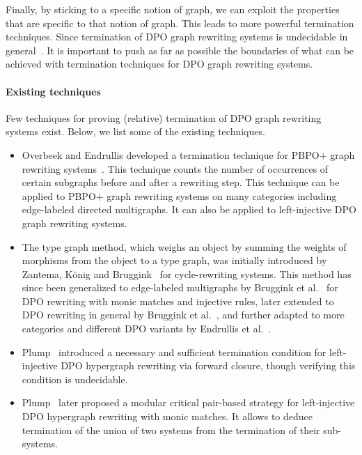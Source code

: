 Finally, by sticking to a specific notion of graph, we can exploit the properties that are specific to that notion of graph. This leads to more powerful termination techniques. Since termination of DPO graph rewriting systems is undecidable in general~\cite{plump1998terminationundecidable}. 
It is important to push as far as possible the boundaries of what can be achieved with termination techniques for DPO graph rewriting systems.

\paragraph{Existing techniques}
Few techniques for proving (relative) termination of DPO graph rewriting systems exist. Below, we list some of the existing techniques.

\begin{itemize}
    \item Overbeek and Endrullis developed a termination technique for PBPO+ graph rewriting systems~\cite{overbeek2024termination_lmcs}. This technique counts the number of occurrences of certain subgraphs before and after a rewriting step. This technique can be applied to PBPO+ graph rewriting systems on many categories including edge-labeled directed multigraphs. It can also be applied to left-injective DPO graph rewriting systems.
    \item The type graph method, which weighs an object by summing the weights of morphisms from the object to a type graph, was initially introduced by Zantema, K{\"o}nig and Bruggink~\cite{zantema2014termination} for cycle-rewriting systems. 
    This method has since been generalized to edge-labeled multigraphs by Bruggink et al.~\cite{bruggink2014termination} for DPO rewriting with monic matches and injective rules, later extended to DPO rewriting in general by Bruggink et al.~\cite{bruggink2015proving}, and further adapted to more categories and different DPO variants by Endrullis et al.~\cite{endrullis2024generalized_arxiv_v2}. 
    \item Plump~\cite{plump1995ontermination} introduced a necessary and sufficient termination condition for left-injective DPO hypergraph rewriting via forward closure, though verifying this condition is undecidable. 
    \item Plump~\cite{plump2018modular} later proposed a modular critical pair-based strategy for left-injective DPO hypergraph rewriting with monic matches. It allows to deduce termination of the union of two systems from the termination of their sub-systems.

\end{itemize}
